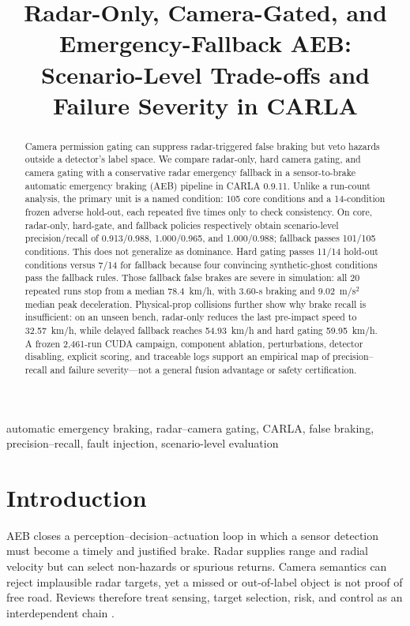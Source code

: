 \documentclass[conference]{IEEEtran}
\title{Radar-Only, Camera-Gated, and Emergency-Fallback AEB: Scenario-Level Trade-offs and Failure Severity in CARLA}
\author{
\IEEEauthorblockN{Mai Viet Hoang and Duc An Pham}
\IEEEauthorblockA{\textit{Hanoi University of Science and Technology}\\
Hanoi, Vietnam\\hoangmai04222@gmail.com}
}
\begin{document}
\maketitle

\begin{abstract}
Camera permission gating can suppress radar-triggered false braking but veto
hazards outside a detector's label space. We compare radar-only, hard camera
gating, and camera gating with a conservative radar emergency fallback in a
sensor-to-brake automatic emergency braking (AEB) pipeline in CARLA 0.9.11.
Unlike a run-count analysis, the primary unit is a named condition: 105 core
conditions and a 14-condition frozen adverse hold-out, each repeated five times
only to check consistency. On core, radar-only, hard-gate, and fallback policies
respectively obtain scenario-level precision/recall of 0.913/0.988,
1.000/0.965, and 1.000/0.988; fallback passes 101/105 conditions. This does not
generalize as dominance. Hard gating passes 11/14 hold-out conditions versus
7/14 for fallback because four convincing synthetic-ghost conditions pass the
fallback rules. Those fallback false brakes are severe in simulation: all 20
repeated runs stop from a median 78.4~km/h, with 3.60-s braking and
9.02~m/s$^2$ median peak deceleration. Physical-prop collisions further show
why brake recall is insufficient: on an unseen bench, radar-only reduces the
last pre-impact speed to 32.57~km/h, while delayed fallback reaches
54.93~km/h and hard gating 59.95~km/h. A frozen 2,461-run CUDA campaign,
component ablation, perturbations, detector disabling, explicit scoring, and
traceable logs support an empirical map of precision--recall and failure
severity---not a general fusion advantage or safety certification.
\end{abstract}

\begin{IEEEkeywords}
automatic emergency braking, radar--camera gating, CARLA, false braking,
precision--recall, fault injection, scenario-level evaluation
\end{IEEEkeywords}

\section{Introduction}
AEB closes a perception--decision--actuation loop in which a sensor detection
must become a timely and justified brake. Radar supplies range and radial
velocity but can select non-hazards or spurious returns. Camera semantics can
reject implausible radar targets, yet a missed or out-of-label object is not
proof of free road. Reviews therefore treat sensing, target selection, risk,
and control as an interdependent chain \cite{yang2022aebreview}.
\end{document}
